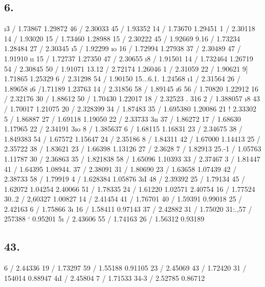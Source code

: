 \documentclass[12pt,a4paper]{article}
\begin{document}
\subsection*{6.}
\i{}3 / 1.73867 1.29872 46 / 2.30033 45 / 1.93352 14 / 1.73670 1.29451 1 / 2.30118 14 / 1.93020 15 / 1.73460 1.28988 15 / 2.30222 45 / 1.92669 9.16 / 1.73234 1.28484 27 / 2.30345 \i{}5 / 1.92299 \i{}o 16 / 1.72994 1.27938 37 / 2.30489 47 / 1.91910 \i{}\i{} 15 / 1.72737 1.27350 47 / 2.30655 \i{}8 / 1.91501 14 / 1.732464 1.26719 54 / 2.30845 50 / 1.91071 13.12 / 2.72174 1.26046 1 /  2.31059 22 / 1.90621 9] 1.71865 1.25329 6 / 2.31298 54 / 1.90150 15...6.1. 1.24568 \i{}1 / 2.31564 26 / 1.89658 \i{}6 /1.71189 1.23763 14 / 2.31856 58 / 1.89145 \i{}6 56 / 1.70820 1.22912 16 / 2.32176 30 / 1.88612 50 / 1.70430 1.22017 18 / 2.32523 . 316 2 / 1.388057 \i{}8 43 / 1.70017 1.21075 20 / 2.328399 34 / 1.87483 35 / 1.695380 1.20086 21 ! 2.33302 5 / 1.86887 27 / 1.69118 1.19050 22 / 2.33733 3\i{}\i{} 37 / 1.86272 17 / 1.68630 1.17965 22 / 2.34191 3\i{}o 8 /  1.385637 6 / 1.68115 1.16831 23 / 2.34675 38 / 1.849383 54 / 1.67572 1.15647 24 / 2.35186 8 / 1.84311 42 / 1.67000 1.14413 25 / 2.35722 38 / 1.83621 23 / 1.66398 1.13126 27 / 2.3628 7 / 1.82913 25.-1 / 1.05763 1.11787 30 / 2.36863 35 / 1.821838 58 / 1.65096 1.10393 33 / 2.37467 3 / 1.81447 41 / 1.64395 1.08944. 37 / 2.38091 31 / 1.80690 23 / 1.63658 1.07439 42 / 2.38733 58 / 1.79919 4 / 1.628384 1.05876 3\i{}I 48 / 2.39392 25 / 1.79134 45 / 1.62072 1.04254 2.40066 51 / 1.78335 24 / 1.61220 1.02571 2.40754 16 / 1.77524 30..2 / 2,60327 1.00827 14 / 2.41454 41 / 1.76701 40 / 1.59391 0.99018 25 / 2.42163 6 / 1.75866 3\i{} 16 / 1.58411 0.97143 37 / 2.42882 31 / 1.75020 31:.,57 / 257388 ` 0.95201 5\i{} / 2.43606 55 / 1.74163 26 / 1.56312 0.93189

\subsection*{43.}
6 / 2.44336 19 / 1.73297 59 / 1.55188 0.91105 23 / 2.45069 43 / 1.72420 31 / 154014 0.88947 4\i{}I / 2.45804 7 / 1.71533 34-3 / 2.52785 0.86712


\newpage
\end{document}
